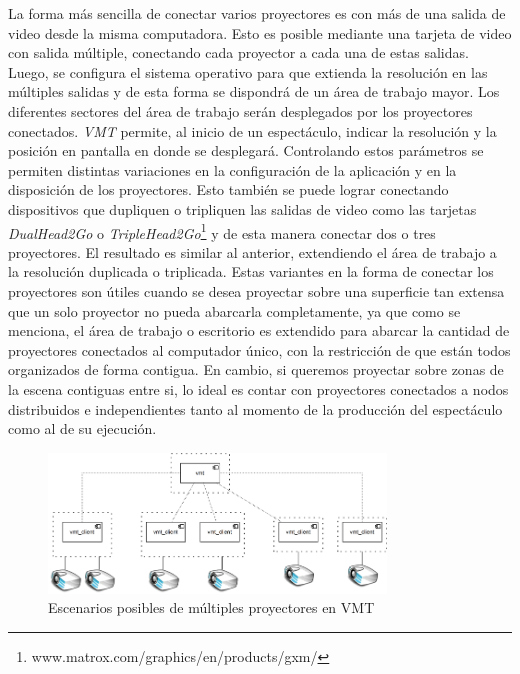 La forma más sencilla de conectar varios proyectores es con más de una salida de video desde la misma computadora. Esto es posible mediante una tarjeta de video con salida múltiple, conectando cada proyector a cada una de estas salidas. Luego, se configura el sistema operativo para que extienda la resolución en las múltiples salidas y de esta forma se dispondrá de un área de trabajo mayor. Los diferentes sectores del área de trabajo serán desplegados por los proyectores conectados.
\emph{VMT} permite, al inicio de un espectáculo, indicar la resolución y la posición en pantalla en donde se desplegará. Controlando estos parámetros se permiten distintas variaciones en la configuración de la aplicación y en la disposición de los proyectores.
Esto también se puede lograr conectando dispositivos que dupliquen o tripliquen las salidas de video como las tarjetas \emph{DualHead2Go} o \emph{TripleHead2Go}\footnote{www.matrox.com/graphics/en/products/gxm/} y de esta manera conectar dos o tres proyectores. El resultado es similar al anterior, extendiendo el área de trabajo a la resolución duplicada o triplicada.
Estas variantes en la forma de conectar los proyectores son útiles cuando se desea proyectar sobre una superficie tan extensa que un solo proyector no pueda abarcarla completamente, ya que como se menciona, el área de trabajo o escritorio es extendido para abarcar la cantidad de proyectores conectados al computador único, con la restricción de que están todos organizados de forma contigua.
En cambio, si queremos proyectar sobre zonas de la escena contiguas entre si, lo ideal es contar con proyectores conectados a nodos distribuidos e independientes tanto al momento de la producción del espectáculo como al de su ejecución.

\begin{figure}[H]
  \centering
    \includegraphics[width=0.8\textwidth]{./Cap5_vmt/vmt_multiProjector.png}
  \caption{Escenarios posibles de múltiples proyectores en VMT}%
  \label{fig:VMT-MultiProjector}
\end{figure}

